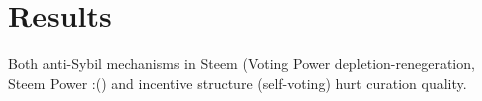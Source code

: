 \section{Results}
  Both anti-Sybil mechanisms in Steem (Voting Power depletion-renegeration,
  Steem Power :() and incentive structure (self-voting) hurt curation quality.
